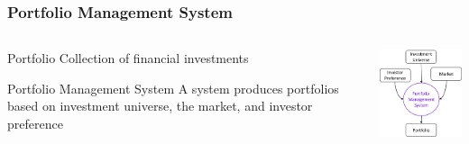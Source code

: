 \begin{frame}
\frametitle{Portfolio Management System}
\begin{columns}
\begin{column}{0.55\textwidth}
\begin{block}{Portfolio}
Collection of financial investments
\end{block}
\begin{block}{Portfolio Management System}
A system produces portfolios based on investment universe, the market, and investor preference
\end{block}
\end{column}
\begin{column}{0.45\textwidth}
\begin{center}
\includegraphics[width=4.8cm]{images/portfolio_management_system.png}
\end{center}
\end{column}
\end{columns}
\end{frame}







